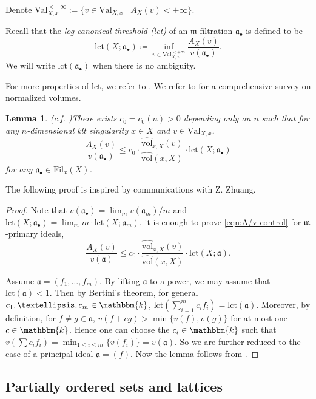 \documentclass[11pt, leqno]{amsart}%
\theoremstyle{plain}
\newtheorem{lemma}[theorem]{Lemma}
\theoremstyle{definition}
\theoremstyle{remark}
\newcommand{\fa}{\mathfrak{a}}
\newcommand{\fm}{\mathfrak{m}}
\newcommand{\lct}{\mathrm{lct}}
\newcommand{\Val}{\mathrm{Val}}
\newcommand{\nvol}{\widehat{\mathrm{vol}}}
\newcommand{\bk}{\mathbbm{k}}
\newcommand{\Fil}{\mathrm{Fil}}
\numberwithin{equation}{section}
\begin{document}
Denote $\Val^{<+\infty}_{X,x}:=\{v\in\Val_{X,x}\mid A_X(v)<+\infty\}$.

Recall that the \emph{log canonical threshold (lct)} of an $\fm$-filtration $\fa_\bullet$ is defined to be
\[
    \lct(X;\fa_\bullet)\coloneqq\inf_{v\in\Val^{<+\infty}_{X,x}}\frac{A_X(v)}{v(\fa_\bullet)}.
\]
We will write $\lct(\fa_\bullet)$ when there is no ambiguity.

For more properties of lct, we refer to \cite{JM12}. We refer to \cites{LLX18,Zhu23} for a comprehensive survey on normalized volumes.


\begin{lemma}(c.f. \cite[Lemma 3.4]{Zhu22})\label{lem:lct control}
    There exists $c_0=c_0(n)>0$ depending only on $n$ such that for any $n$-dimensional klt singularity $x\in X$ and $v\in\Val_{X,x}$, 
    \begin{equation}\label{eqn:A/v control}
        \frac{A_X(v)}{v(\fa_\bullet)}\le c_0\cdot\frac{\nvol_{x,X}(v)}{\nvol(x,X)}\cdot\lct(X;\fa_\bullet)
    \end{equation}
    for any $\fa_\bullet\in\Fil_x(X)$.
\end{lemma}

The following proof is inspired by communications with Z. Zhuang.

\begin{proof}
    Note that $v(\fa_\bullet)=\lim_m v(\fa_m)/m$ and $\lct(X;\fa_\bullet)=\lim_m m\cdot \lct(X;\fa_m)$, it is enough to prove \eqref{eqn:A/v control} for $\fm$-primary ideals, 
    \[
        \frac{A_X(v)}{v(\fa)}\le c_0\cdot\frac{\nvol_{x,X}(v)}{\nvol(x,X)}\cdot\lct(X;\fa).
    \]
	
    Assume $\fa=(f_1,\ldots,f_m)$. By lifting $\fa$ to a power, we may assume that $\lct(\fa)<1$. Then by Bertini's theorem, for general $c_1,\ldots,c_m\in \bk$, $\lct(\sum_{i=1}^m c_if_i)=\lct(\fa)$.		Moreover, by definition, for $f\ne g\in\fa$, $v(f+cg)>\min\{v(f),v(g)\}$ for at most one $c\in\bk$. Hence one can choose the $c_i\in\bk$ such that $v(\sum c_if_i)=\min_{1\le i\le m}\{v(f_i)\}=v(\fa)$. So we are further reduced to the case of a principal ideal $\fa=(f)$. Now the lemma follows from \cite[Lemma 3.4]{Zhu22}.
\end{proof}



\subsection{Partially ordered sets and lattices}\label{ssec:posets}
\end{document}
